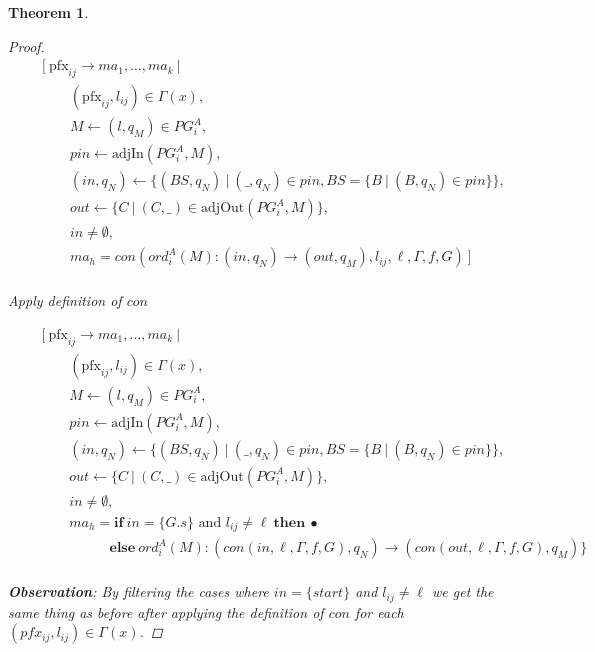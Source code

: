 \documentclass[twocolumn, openany]{sig-alternate-10pt}
\newcommand{\Pfx}{\mathrm{pfx}}%
\newtheorem{thm}{Theorem}
\begin{document}
\begin{thm}
\begin{proof}
  \[ \begin{array}{l}
     ~~~~~~~~~ [~ \Pfx_{ij} \rightarrow ma_1, \dots, ma_k ~\vert~ \\ 
     ~~~~~~~~~~~~~~~~~~ (\Pfx_{ij},l_{ij}) \in \Gamma(x), \\
     ~~~~~~~~~~~~~~~~~~ M \leftarrow (l,q_M) \in PG^A_i, \\
     ~~~~~~~~~~~~~~~~~~ pin \leftarrow \text{adjIn}(PG^A_i,M), \\
     ~~~~~~~~~~~~~~~~~~ (in,q_N) \leftarrow \{ (BS,q_N) ~\vert~ (\_,q_N) \in pin, BS=\{B ~\vert~ (B,q_N) \in pin \} \}, \\
     ~~~~~~~~~~~~~~~~~~ out \leftarrow \{ C ~\vert~ (C,\_) \in \text{adjOut}(PG^A_i,M) \}, \\
     ~~~~~~~~~~~~~~~~~~ in \neq \emptyset, \\
     ~~~~~~~~~~~~~~~~~~ ma_h = con(ord^A_i(M) : (in,q_N) \rightarrow (out,q_M),l_{ij},\ell,\Gamma,f,G) ~] \\
  \end{array} \]%

  Apply definition of $con$

  \[ \begin{array}{l}
     ~~~~~~~~~ [~ \Pfx_{ij} \rightarrow ma_1, \dots, ma_k ~\vert~ \\ 
     ~~~~~~~~~~~~~~~~~~ (\Pfx_{ij},l_{ij}) \in \Gamma(x), \\
     ~~~~~~~~~~~~~~~~~~ M \leftarrow (l,q_M) \in PG^A_i, \\
     ~~~~~~~~~~~~~~~~~~ pin \leftarrow \text{adjIn}(PG^A_i,M), \\
     ~~~~~~~~~~~~~~~~~~ (in,q_N) \leftarrow \{ (BS,q_N) ~\vert~ (\_,q_N) \in pin, BS=\{B ~\vert~ (B,q_N) \in pin \} \}, \\
     ~~~~~~~~~~~~~~~~~~ out \leftarrow \{ C ~\vert~ (C,\_) \in \text{adjOut}(PG^A_i,M) \}, \\
     ~~~~~~~~~~~~~~~~~~ in \neq \emptyset, \\
     ~~~~~~~~~~~~~~~~~~ ma_h = \textbf{if}~ in=\{ G.s \} \text{ and } l_{ij} \neq \ell ~\textbf{then}~ \bullet \\ 
     ~~~~~~~~~~~~~~~~~~~~~~~~~~~~~~~ \textbf{else}~ ord^A_i(M) : (con(in,\ell,\Gamma,f,G),q_N) \rightarrow (con(out,\ell,\Gamma,f,G),q_M) \} \\
  \end{array} \]%

  \textbf{Observation}: 
  By filtering the cases where $in = \{ \mathit{start} \}$ and $l_{ij} \neq \ell$ we get the same thing as before after applying the definition of $con$ for each $(pfx_{ij}, l_{ij}) \in \Gamma(x)$.


\end{proof}
\end{thm}
\end{document}
